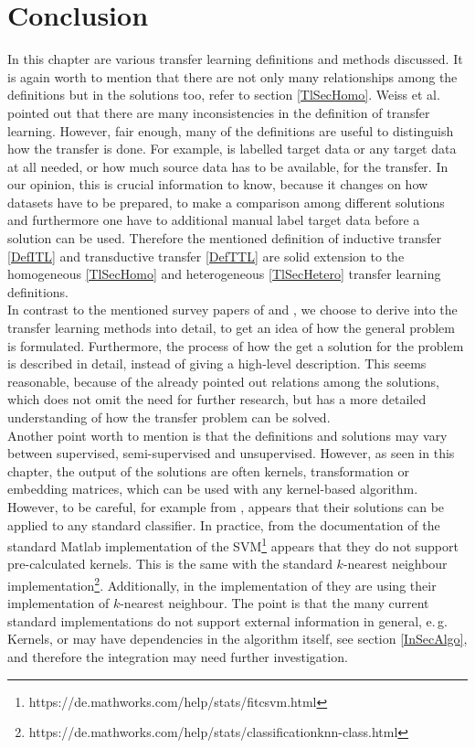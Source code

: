 \section{Conclusion}
In this chapter are various transfer learning definitions and methods discussed.
It is again worth to mention that there are not only many relationships among the definitions but in the solutions too, refer to section \ref{TlSecHomo}.
Weiss et al. pointed out that there are many inconsistencies in the definition of transfer learning.\cite[p. 5-6]{Weiss.2016}
However, fair enough, many of the definitions are useful to distinguish how the transfer is done.
For example, is labelled target data or any target data at all needed, or how much source data has to be available, for the transfer.
In our opinion, this is crucial information to know, because it changes on how datasets have to be prepared, to make a comparison among different solutions and furthermore one have to additional manual label target data before a solution can be used.
Therefore the mentioned definition of inductive transfer \ref{DefITL} and transductive transfer \ref{DefTTL} are solid extension to the homogeneous \ref{TlSecHomo} and heterogeneous \ref{TlSecHetero} transfer learning definitions.\\
In contrast to the mentioned survey papers of \cite{Weiss.2016} and \cite{Pan.2010}, we choose to derive into the transfer learning methods into detail, to get an idea of how the general problem is formulated.
Furthermore, the process of how the get a solution for the problem is described in detail, instead of giving a high-level description.
This seems reasonable, because of the already pointed out relations among the solutions, which does not omit the need for further research, but has a more detailed understanding of how the transfer problem can be solved.\\
Another point worth to mention is that the definitions and solutions may vary between supervised, semi-supervised and unsupervised.
However, as seen in this chapter, the output of the solutions are often kernels, transformation or embedding matrices, which can be used with any kernel-based algorithm.
However, to be careful, for example from \cite{Long.}, \cite{Long.2015} \cite{Gong.} appears that their solutions can be applied to any standard classifier.
In practice, from the documentation of the standard Matlab implementation of the \acl{SVM}\footnote{https://de.mathworks.com/help/stats/fitcsvm.html} appears that they do not support pre-calculated kernels.
This is the same with the standard $k$-nearest neighbour implementation\footnote{https://de.mathworks.com/help/stats/classificationknn-class.html}.
Additionally, in the implementation of \cite{Gong.} they are using their implementation of $k$-nearest neighbour.
The point is that the many current standard implementations do not support external information in general, e.\,g. Kernels, or may have dependencies in the algorithm itself, see section \ref{InSecAlgo}, and therefore the integration may need further investigation.\\
